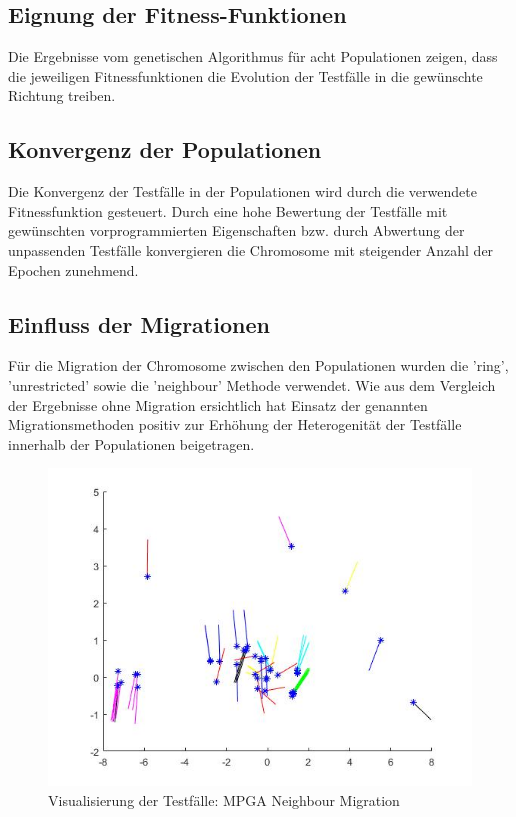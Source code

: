 \documentclass[12pt,a4paper]{article}
\begin{document}
\subsection{Eignung der Fitness-Funktionen}
Die Ergebnisse vom genetischen Algorithmus für acht  Populationen zeigen, dass die jeweiligen Fitnessfunktionen die Evolution der Testfälle in die gewünschte Richtung treiben. 
\subsection{Konvergenz der Populationen}
Die Konvergenz der Testfälle in der Populationen wird durch die verwendete Fitnessfunktion gesteuert. Durch eine hohe Bewertung der Testfälle mit gewünschten vorprogrammierten Eigenschaften bzw. durch Abwertung der unpassenden Testfälle konvergieren die Chromosome mit steigender Anzahl der Epochen zunehmend.
\subsection{Einfluss der Migrationen}
Für die Migration der Chromosome zwischen den Populationen wurden die 'ring', 'unrestricted' sowie die 'neighbour' Methode verwendet. Wie aus dem Vergleich der Ergebnisse ohne Migration ersichtlich hat Einsatz der genannten Migrationsmethoden positiv zur Erhöhung der Heterogenität der Testfälle innerhalb der Populationen beigetragen.
\begin{figure}\centering
\includegraphics[width=.6\textwidth]{mpga_neighbour.jpg}
\caption{Visualisierung der Testfälle: MPGA Neighbour Migration}
\end{figure}
\label{fig:mpganeihb}
\end{document}
